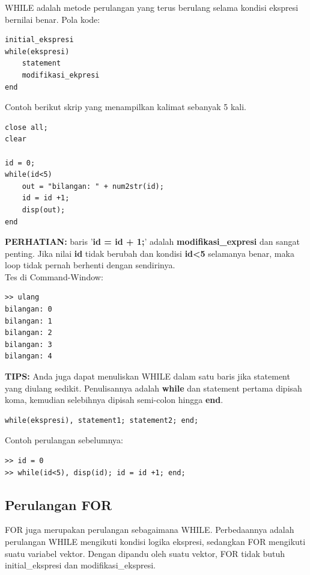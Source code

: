 \documentclass[12pt]{book}
\begin{document}
	WHILE adalah metode perulangan yang terus berulang selama kondisi ekspresi bernilai benar.
	Pola kode:
	\begin{verbatim}
initial_ekspresi
while(ekspresi)
	statement
	modifikasi_ekpresi
end
	\end{verbatim}

	Contoh berikut skrip yang menampilkan kalimat sebanyak 5 kali.
	\begin{verbatim}
close all;
clear

id = 0;
while(id<5)
	out = "bilangan: " + num2str(id);
	id = id +1;
	disp(out);
end
	\end{verbatim}

	\textbf{PERHATIAN:} baris '\textbf{id = id + 1;}' adalah \textbf{modifikasi\_expresi} dan sangat penting.
	Jika nilai \textbf{id} tidak berubah dan kondisi \textbf{id<5} selamanya benar, maka loop tidak pernah berhenti dengan sendirinya.\\
	
	Tes di Command-Window:
	\begin{verbatim}
>> ulang
bilangan: 0
bilangan: 1
bilangan: 2
bilangan: 3
bilangan: 4
	\end{verbatim}

	\textbf{TIPS:} Anda juga dapat menuliskan WHILE dalam satu baris jika statement yang diulang sedikit.
	Penulisannya adalah \textbf{while} dan statement pertama dipisah koma, kemudian selebihnya dipisah semi-colon hingga \textbf{end}.
	\begin{verbatim}
while(ekspresi), statement1; statement2; end;
	\end{verbatim}

	Contoh perulangan sebelumnya:
	\begin{verbatim}
>> id = 0
>> while(id<5), disp(id); id = id +1; end;
	\end{verbatim}

	\subsection{Perulangan FOR}
	
	FOR juga merupakan perulangan sebagaimana WHILE.
	Perbedaannya adalah perulangan WHILE mengikuti kondisi logika ekspresi,
	sedangkan FOR mengikuti suatu variabel vektor.
	Dengan dipandu oleh suatu vektor, FOR tidak butuh initial\_ekspresi dan modifikasi\_ekspresi.
	
\end{document}
